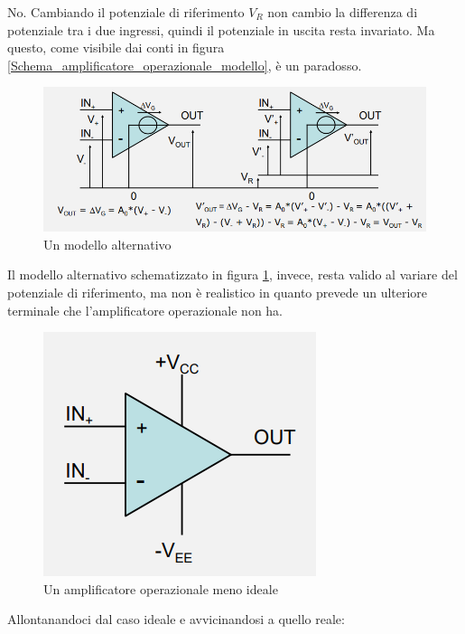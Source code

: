 \documentclass{article}
\begin{document}
No. Cambiando il potenziale di riferimento $V_R$ non cambio la differenza di potenziale tra i due ingressi, quindi il potenziale in uscita resta invariato. Ma questo, come visibile dai conti in figura \ref{Schema_amplificatore_operazionale_modello}, è un paradosso.

\begin{figure}[h]
  \centering
  \includegraphics[scale=0.55]{IM_amplificatore_operazionale_modello_bis}
  \caption{Un modello alternativo}
  \label{Schema_amplificatore_operazionale_modello_bis}
\end{figure}

Il modello alternativo schematizzato in figura \ref{Schema_amplificatore_operazionale_modello_bis}, invece, resta valido al variare del potenziale di riferimento, ma non è realistico in quanto prevede un ulteriore terminale che l'amplificatore operazionale non ha.

\begin{figure}[h]
  \centering
  \includegraphics[scale=0.6]{IM_amplificatore_operazionale_meno_ideale}
  \caption{Un amplificatore operazionale meno ideale}
  \label{Schema_amplificatore_operazionale_meno_ideale}
\end{figure}

Allontanandoci dal caso ideale e avvicinandosi a quello reale:
\end{document}

